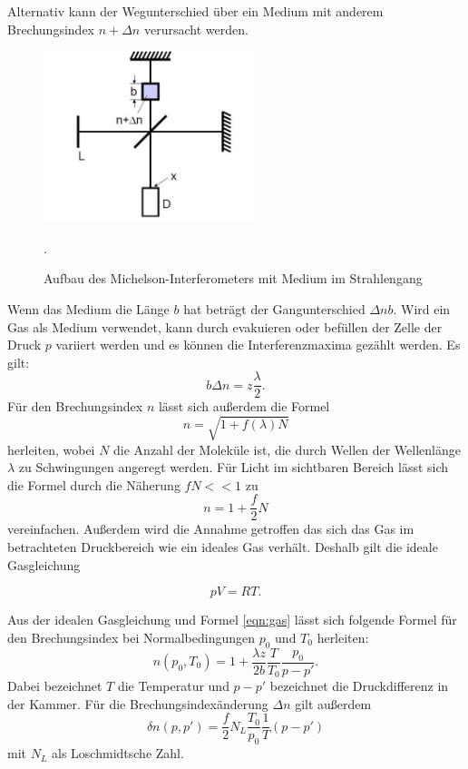 Alternativ kann der Wegunterschied über ein Medium mit anderem Brechungsindex $n+\Delta n$
verursacht werden.
\begin{figure}[H]
  \centering
  \includegraphics[height=5cm]{gas.JPG}
  \caption{Aufbau des Michelson-Interferometers mit Medium im Strahlengang}
  \label{fig:gas}
  \cite{skript}.
\end{figure}

Wenn das Medium die Länge $b$ hat beträgt der Gangunterschied $\Delta nb$.
Wird ein Gas als Medium verwendet, kann durch evakuieren oder befüllen der Zelle der
Druck $p$ variiert werden und es können die Interferenzmaxima gezählt werden.
Es gilt:
\begin{equation}
  b\Delta n = z \frac{\lambda}{2}
  \label{eqn:gas}.
\end{equation}
Für den Brechungsindex $n$ lässt sich außerdem die Formel
\begin{equation}
  n=\sqrt{1+f(\lambda)N}
\end{equation}
herleiten, wobei $N$ die Anzahl der Moleküle ist, die durch Wellen der Wellenlänge
$\lambda$ zu Schwingungen angeregt werden. Für Licht im sichtbaren Bereich lässt
sich die Formel durch die Näherung $fN<<1$  zu
\begin{equation}
  n=1+\frac{f}{2}N
\end{equation}
vereinfachen.
Außerdem wird die Annahme getroffen das sich das Gas im betrachteten Druckbereich
wie ein ideales Gas verhält. Deshalb gilt die ideale Gasgleichung

\begin{equation}
  pV=RT.
\end{equation}

Aus der idealen Gasgleichung und Formel \ref{eqn:gas} lässt sich folgende Formel für
den Brechungsindex bei Normalbedingungen $p_{0}$ und $T_{0}$ herleiten:
\begin{equation}
  n(p_{0},T_{0})= 1+ \frac{\lambda z}{2b}\frac{T}{T_{0}}\frac{p_{0}}{p-p'}.
  \label{eqn:brech}
\end{equation}
Dabei bezeichnet $T$ die Temperatur und $p-p'$ bezeichnet die Druckdifferenz in der Kammer.
Für die Brechungsindexänderung $\Delta n$ gilt außerdem
\begin{equation}
  \delta n(p,p')= \frac{f}{2}N_{L}\frac{T_{0}}{p_{0}}\frac{1}{T}(p-p')
\end{equation}
mit $N_{L}$ als Loschmidtsche Zahl.

